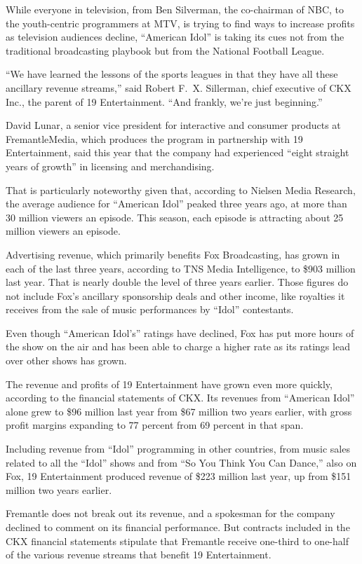 \documentclass[12pt,a4paper,onecolumn]{article}
\begin{document}
While everyone in television, from Ben Silverman, the co-chairman of NBC, to the youth-centric
programmers at MTV, is trying to find ways to increase profits as television audiences decline,
``American Idol'' is taking its cues not from the traditional broadcasting playbook but from the
National Football League.

``We have learned the lessons of the sports leagues in that they have all these ancillary revenue
streams,'' said Robert F.~X. Sillerman, chief executive of CKX Inc., the parent of 19 Entertainment.
``And frankly, we're just beginning.''

David Lunar, a senior vice president for interactive and consumer products at FremantleMedia, which
produces the program in partnership with 19 Entertainment, said this year that the company had
experienced ``eight straight years of growth'' in licensing and merchandising.

That is particularly noteworthy given that, according to Nielsen Media Research, the average
audience for ``American Idol'' peaked three years ago, at more than 30 million viewers an episode.
This season, each episode is attracting about 25 million viewers an episode.

Advertising revenue, which primarily benefits Fox Broadcasting, has grown in each of the last three
years, according to TNS Media Intelligence, to \$903 million last year. That is nearly double the
level of three years earlier. Those figures do not include Fox's ancillary sponsorship deals and
other income, like royalties it receives from the sale of music performances by ``Idol''
contestants.

Even though ``American Idol's'' ratings have declined, Fox has put more hours of the show on the air
and has been able to charge a higher rate as its ratings lead over other shows has grown.

The revenue and profits of 19 Entertainment have grown even more quickly, according to the financial
statements of CKX. Its revenues from ``American Idol'' alone grew to \$96 million last year from
\$67 million two years earlier, with gross profit margins expanding to 77 percent from 69 percent in
that span.

Including revenue from ``Idol'' programming in other countries, from music sales related to all the
``Idol'' shows and from ``So You Think You Can Dance,'' also on Fox, 19 Entertainment produced
revenue of \$223 million last year, up from \$151 million two years earlier.

Fremantle does not break out its revenue, and a spokesman for the company declined to comment on its
financial performance. But contracts included in the CKX financial statements stipulate that
Fremantle receive one-third to one-half of the various revenue streams that benefit 19
Entertainment.
\end{document}
